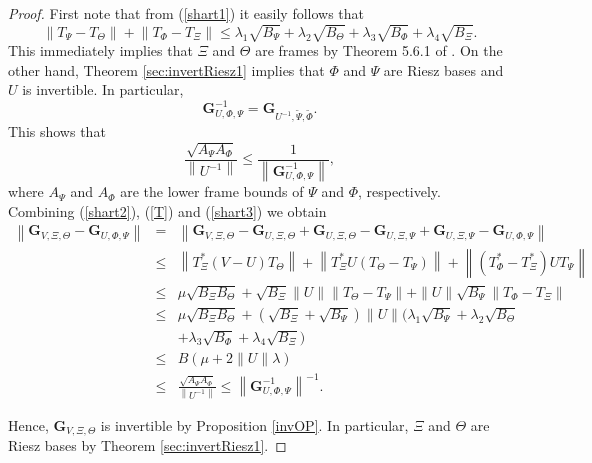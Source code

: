 \documentclass{birkjour}
\theoremstyle{definition}
\theoremstyle{remark}
\numberwithin{equation}{section}
\begin{document}
\begin{proof}
First note that from (\ref{shart1}) it easily follows that
\begin{equation}\label{T}
\left\|T_{\Psi}-T_{\Theta}\right\|+\left\|T_{\Phi}-T_{\Xi}\right\|\leq
\lambda_{1}\sqrt{B_{\Psi}}+\lambda_{2}\sqrt{B_{\Theta}}+
\lambda_{3}\sqrt{B_{\Phi}}+\lambda_{4}\sqrt{B_{\Xi}}.
\end{equation}
This immediately implies that $\Xi$ and $\Theta$ are frames
by Theorem 5.6.1 of \cite{Chr08}.
On the other hand, Theorem
\ref{sec:invertRiesz1} implies that $\Phi$ and $\Psi$  are Riesz bases and $U$
is invertible. In particular,
\begin{equation*}
\mathbf{G}_{U,\Phi,\Psi}^{-1}=
\mathbf{G}_{U^{-1},\widetilde{\Psi},\widetilde{\Phi}}.
\end{equation*}
This shows that
\begin{equation}\label{shart3}
\frac{\sqrt{A_{\Psi}A_{\Phi}}}{\left\|U^{-1}\right\|}\leq \frac{1}{\left\|\mathbf{G}_{U,\Phi,\Psi}^{-1}\right\|},
\end{equation}
where $A_{\Psi}$ and $A_{\Phi}$ are the lower frame bounds of
$\Psi$ and $\Phi$, respectively. Combining  (\ref{shart2}),
(\ref{T}) and (\ref{shart3}) we obtain
\begin{eqnarray*}
\left\|\mathbf{G}_{V,\Xi,\Theta}-\mathbf{G}_{U,\Phi,\Psi}\right\|&=&\left\|\mathbf{G}_{V,\Xi,\Theta}-\mathbf{G}_{U,\Xi,\Theta}+\mathbf{G}_{U,\Xi,\Theta}-\mathbf{G}_{U,\Xi,\Psi}+\mathbf{G}_{U,\Xi,\Psi}-\mathbf{G}_{U,\Phi,\Psi}\right\|\\
&\leq&\left\|T_{\Xi}^{*}(V-U)T_{\Theta}\right\|+\left\|T_{\Xi}^{*}U(T_{\Theta}-T_{\Psi})\right\|+\left\|(T_{\Phi}^{*}-T_{\Xi}^{*})UT_{\Psi}\right\|\\
&\leq&\mu\sqrt{B_{\Xi}B_{\Theta}}+\sqrt{B_{\Xi}}\|U\|\left\|T_{\Theta}-T_{\Psi}\right\|+\|U\|\sqrt{B_{\Psi}}\left\|T_{\Phi}-T_{\Xi}\right\|\\
&\leq&\mu\sqrt{B_{\Xi}B_{\Theta}}+(\sqrt{B_{\Xi}}+\sqrt{B_{\Psi}})\|U\|(\lambda_{1}\sqrt{B_{\Psi}}+\lambda_{2}\sqrt{B_{\Theta}}\\
&&+
\lambda_{3}\sqrt{B_{\Phi}}+\lambda_{4}\sqrt{B_{\Xi}})\\
&\le & B\left(\mu+2\|U\|\lambda\right) \\
&\leq& \frac{\sqrt{A_{\Psi}A_{\Phi}}}{\left\|U^{-1}\right\|}\leq \left\|\mathbf{G}_{U,\Phi,\Psi}^{-1}\right\|^{-1}.
\end{eqnarray*}

Hence, $\mathbf{G}_{V,\Xi,\Theta}$ is invertible by  Proposition
\ref{invOP}.  In particular, $\Xi$ and $\Theta$ are Riesz
bases by Theorem \ref{sec:invertRiesz1}.
\end{proof}
\end{document}
